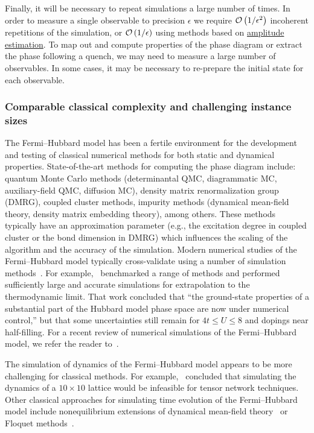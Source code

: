 \begin{refsection}
Finally, it will be necessary to repeat simulations a large number of times. In order to measure a single observable to precision $\epsilon$ we require $\mathcal{O}\left( 1/\epsilon^2 \right)$ incoherent repetitions of the simulation, or $\mathcal{O}\left( 1/\epsilon \right)$ using methods based on \hyperref[prim:AmpEst]{amplitude estimation}. To map out and compute properties of the phase diagram or extract the phase following a quench, we may need to measure a large number of observables. In some cases, it may be necessary to re-prepare the initial state for each observable. 





\subsubsection*{Comparable classical complexity and challenging instance sizes}
The Fermi--Hubbard model has been a fertile environment for the development and testing of classical numerical methods for both static and dynamical properties. State-of-the-art methods for computing the phase diagram include: quantum Monte Carlo methods (determinantal QMC, diagrammatic MC, auxiliary-field QMC, diffusion MC), density matrix renormalization group (DMRG), coupled cluster methods, impurity methods (dynamical mean-field theory, density matrix embedding theory), among others. These methods typically have an approximation parameter (e.g., the excitation degree in coupled cluster or the bond dimension in DMRG) which influences the scaling of the algorithm and the accuracy of the simulation. Modern numerical studies of the Fermi--Hubbard model typically cross-validate using a number of simulation methods~\cite{leblanc2015TwoDimHubbard,schafer2021MultiMethodHubbard}. For example,~\cite{leblanc2015TwoDimHubbard} benchmarked a range of methods and performed sufficiently large and accurate simulations for extrapolation to the thermodynamic limit. That work concluded that ``the ground-state properties of a substantial part of the Hubbard model phase space are now under numerical control,'' but that some uncertainties still remain for $4t \leq U \leq 8$ and dopings near half-filling. For a recent review of numerical simulations of the Fermi--Hubbard model, we refer the reader to~\cite{Qin2022HubbardComputational}.


The simulation of dynamics of the Fermi--Hubbard model appears to be more challenging for classical methods. For example,~\cite{daley2022,flannigan2022} concluded that simulating the dynamics of a $10 \times 10$ lattice would be infeasible for tensor network techniques. Other classical approaches for simulating time evolution of the Fermi--Hubbard model include nonequilibrium extensions of dynamical mean-field theory~\cite{aoki2014NonequilibriumFH} or Floquet methods~\cite{oka2019FermiHubbardDynamics}.






\end{refsection}
